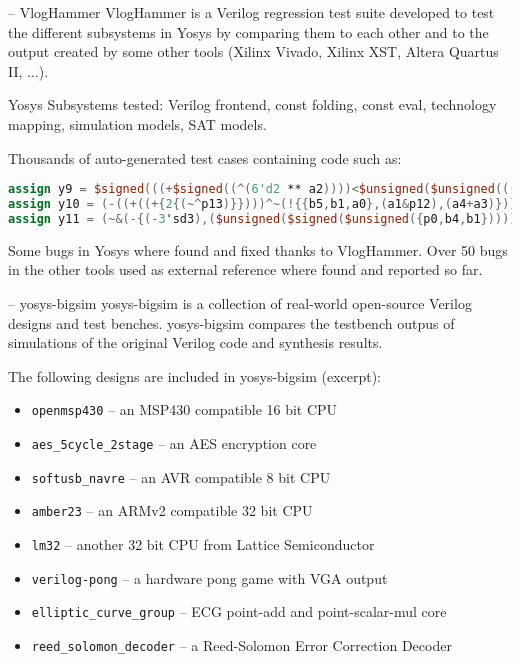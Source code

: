 \begin{frame}[fragile]{\subsecname{} -- VlogHammer}
VlogHammer is a Verilog regression test suite developed to test the different
subsystems in Yosys by comparing them to each other and to the output created
by some other tools (Xilinx Vivado, Xilinx XST, Altera Quartus II, ...).

\bigskip
Yosys Subsystems tested: Verilog frontend, const folding, const eval, technology mapping,
simulation models, SAT models.

\bigskip
Thousands of auto-generated test cases containing code such as:
\begin{lstlisting}[xleftmargin=1cm, basicstyle=\ttfamily\fontsize{8pt}{10pt}\selectfont, language=Verilog]
assign y9 = $signed(((+$signed((^(6'd2 ** a2))))<$unsigned($unsigned(((+a3))))));
assign y10 = (-((+((+{2{(~^p13)}})))^~(!{{b5,b1,a0},(a1&p12),(a4+a3)})));
assign y11 = (~&(-{(-3'sd3),($unsigned($signed($unsigned({p0,b4,b1}))))}));
\end{lstlisting}

\bigskip
Some bugs in Yosys where found and fixed thanks to VlogHammer. Over 50 bugs in
the other tools used as external reference where found and reported so far.
\end{frame}

\begin{frame}{\subsecname{} -- yosys-bigsim}
yosys-bigsim is a collection of real-world open-source Verilog designs and test
benches. yosys-bigsim compares the testbench outpus of simulations of the original
Verilog code and synthesis results.

\bigskip
The following designs are included in yosys-bigsim (excerpt):
\begin{itemize}
\item {\tt openmsp430} -- an MSP430 compatible 16 bit CPU
\item {\tt aes\_5cycle\_2stage} -- an AES encryption core
\item {\tt softusb\_navre} -- an AVR compatible 8 bit CPU
\item {\tt amber23} -- an ARMv2 compatible 32 bit CPU
\item {\tt lm32} -- another 32 bit CPU from Lattice Semiconductor
\item {\tt verilog-pong} -- a hardware pong game with VGA output
\item {\tt elliptic\_curve\_group} -- ECG point-add and point-scalar-mul core
\item {\tt reed\_solomon\_decoder} -- a Reed-Solomon Error Correction Decoder
\end{itemize}
\end{frame}

